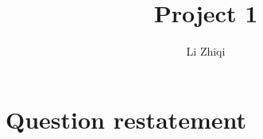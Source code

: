 \documentclass[a4paper]{article}
\title{Project 1}
\author{Li Zhiqi\quad3180103041}
\theoremstyle{definition}
\begin{document}
\maketitle
\section{Question restatement}
\end{document}
